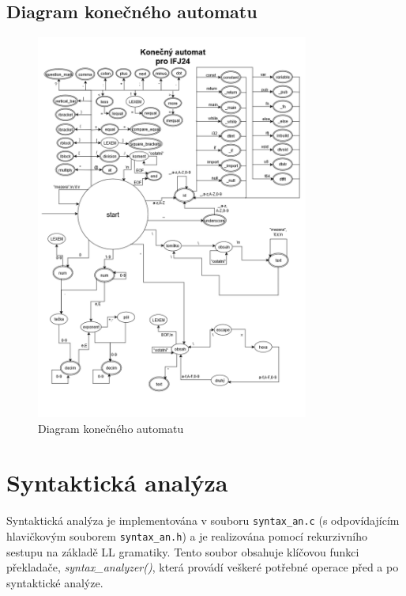 \documentclass[a4paper, 12pt]{article}
\begin{document}
\subsection{Diagram konečného automatu}
\begin{figure}[ht!]
    \begin{center}
        \includegraphics[origin=c, width=0.8\textwidth]{images/FSM_IFJ24.drawio.png}
        \caption{Diagram konečného automatu}
    \end{center}
\end{figure}

\newpage
{}
\section{Syntaktická analýza}

Syntaktická analýza je implementována v souboru \texttt{syntax\_an.c} (s odpovídajícím hlavičkovým souborem \texttt{syntax\_an.h}) a je realizována pomocí rekurzivního sestupu na základě LL gramatiky. Tento soubor obsahuje klíčovou funkci překladače, \textit{syntax\_analyzer()}, která provádí veškeré potřebné operace před a po syntaktické analýze.
\end{document}
